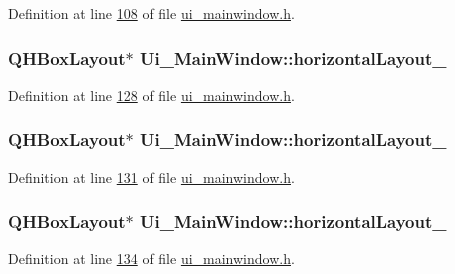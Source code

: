 Definition at line \hyperlink{a00052_source_l00108}{108} of file \hyperlink{a00052_source}{ui\+\_\+mainwindow.\+h}.

\hypertarget{a00027_ad81454913b05646674b1a41c595b8510}{
\subsubsection[{horizontal\+Layout\+\_\+12}]{\setlength{\rightskip}{0pt plus 5cm}Q\+H\+Box\+Layout$\ast$ Ui\+\_\+\+Main\+Window\+::horizontal\+Layout\+\_}}\label{a00027_ad81454913b05646674b1a41c595b8510}


Definition at line \hyperlink{a00052_source_l00128}{128} of file \hyperlink{a00052_source}{ui\+\_\+mainwindow.\+h}.

\hypertarget{a00027_a3b24c4bb360d79ae2e886fe63c8fdac7}{
\subsubsection[{horizontal\+Layout\+\_\+13}]{\setlength{\rightskip}{0pt plus 5cm}Q\+H\+Box\+Layout$\ast$ Ui\+\_\+\+Main\+Window\+::horizontal\+Layout\+\_}}\label{a00027_a3b24c4bb360d79ae2e886fe63c8fdac7}


Definition at line \hyperlink{a00052_source_l00131}{131} of file \hyperlink{a00052_source}{ui\+\_\+mainwindow.\+h}.

\hypertarget{a00027_aa53955f35b7d9f3d161525ed8639db84}{
\subsubsection[{horizontal\+Layout\+\_\+14}]{\setlength{\rightskip}{0pt plus 5cm}Q\+H\+Box\+Layout$\ast$ Ui\+\_\+\+Main\+Window\+::horizontal\+Layout\+\_}}\label{a00027_aa53955f35b7d9f3d161525ed8639db84}


Definition at line \hyperlink{a00052_source_l00134}{134} of file \hyperlink{a00052_source}{ui\+\_\+mainwindow.\+h}.


